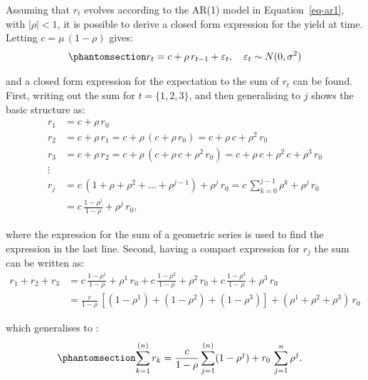 \documentclass[
  letterpaper,
  DIV=11,
  numbers=noendperiod]{scrreprt}
\begin{document}
Assuming that \(r_t\) evolves according to the AR(1) model in
Equation~\ref{eq-ar1}, with \(|\rho| < 1\), it is possible to derive a
closed form expression for the yield at time. Letting
\(c = \mu \, (1-\rho)\) gives:
\begin{equation}\protect\phantomsection\label{eq-AR1-1}{
\begin{align}
    r_t = c + \rho \, r_{t-1} + \varepsilon_t, \quad \varepsilon_t \sim N(0, \sigma^2)
\end{align}
}\end{equation}

and a closed form expression for the expectation to the sum of \(r_t\)
can be found. First, writing out the sum for \(t=\{1,2,3\}\), and then
generalising to \(j\) shows the basic structure as:
\begin{align}
        r_1 &= c + \rho \, r_0 \nonumber \\
        r_2 &= c + \rho \, r_1 = c + \rho \, (c + \rho \, r_0) = c + \rho \, c + \rho^2 \, r_0  \nonumber \\
        r_3 &= c + \rho \, r_2 = c + \rho \, (c + \rho \, c + \rho^2 \,r_0) = c + \rho \, c + \rho^2 \, c + \rho^3 \, r_0 \nonumber \\
        \vdots \nonumber \\
        r_j &= c \, (1+\rho+\rho^2+\dots + \rho^{j-1}) + \rho^j \, r_0 = c\, \sum_{k=0}^{j-1} \rho^k + \rho^j \, r_0 \nonumber \\
        &= c\, \frac{1-\rho^j}{1-\rho} + \rho^j \, r_0,
\end{align}

where the expression for the sum of a geometric series is used to find
the expression in the last line. Second, having a compact expression for
\(r_j\) the sum can be written as:
\begin{align}
    r_1+r_2+r_3 &= c\, \frac{1-\rho^1}{1-\rho} + \rho^1 \, r_0 + c\, \frac{1-\rho^2}{1-\rho} + \rho^2 \, r_0 + c\, \frac{1-\rho^3}{1-\rho} + \rho^3 \, r_0 \nonumber \\
    &= \frac{c}{1-\rho}\, \left[ (1-\rho^1)+(1-\rho^2)+(1-\rho^3) \right]+(\rho^1+\rho^2+\rho^3) \, r_0
\end{align}

which generalises to :
\begin{equation}\protect\phantomsection\label{eq-sum-r-k}{
\begin{align}
    \sum_{k=1}^{(n)} r_k &= \frac{c}{1-\rho} \sum_{j=1}^{(n)} (1-\rho^j) + r_0 \, \sum_{j=1}^{n} \rho^j.
\end{align}
}\end{equation}
\end{document}
